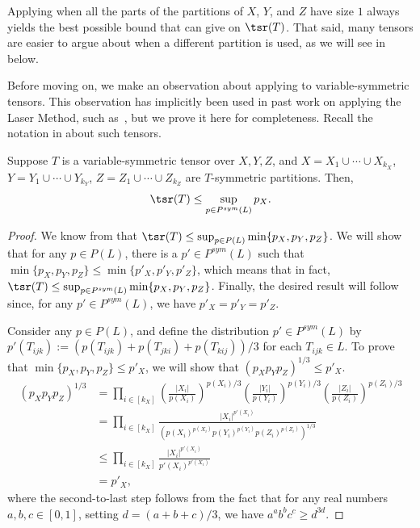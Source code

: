 \documentclass{toc}
\begin{document}
\begin{remark}
Applying  when all the parts of the partitions of $X$, $Y$, and $Z$ have size $1$ always yields the best possible bound that  can give on $\tsr(T)$. That said, many tensors are easier to argue about when a different partition is used, as we will see in  below.
\end{remark}


Before moving on, we make an observation about applying  to variable-symmetric tensors. This observation has implicitly been used in past work on applying the Laser Method, such as~\cite{coppersmith}, but we prove it here for completeness. Recall the notation in  about such tensors.

\begin{proposition} \label{symmprop}
Suppose $T$ is a variable-symmetric tensor over $X,Y,Z$, and $X = X_1 \cup \cdots \cup X_{k_X}$, $Y = Y_1 \cup \cdots \cup Y_{k_Y}$, $Z = Z_1 \cup \cdots \cup Z_{k_Z}$ are $T$-symmetric partitions. Then,
$$\tsr(T) \leq \sup_{p \in P^{sym}(L)} p_X.$$
\end{proposition}

\begin{proof}
We know from  that $\tsr(T) \leq \sup_{p \in P(L)} \min\{ p_X, p_Y, p_Z \}$. We will show that for any $p \in P(L)$, there is a $p' \in P^{sym}(L)$ such that $\min\{ p_X, p_Y, p_Z \} \leq \min\{ p'_X, p'_Y, p'_Z \}$, which means that in fact, $\tsr(T) \leq \sup_{p \in P^{sym}(L)} \min\{ p_X, p_Y, p_Z \}$. Finally, the desired result will follow since, for any $p' \in P^{sym}(L)$, we have $p'_X = p'_Y = p'_Z$. 

Consider any $p \in P(L)$, and define the distribution $p' \in P^{sym}(L)$ by $p'(T_{ijk}) := (p(T_{ijk}) + p(T_{jki}) + p(T_{kij}))/3$ for each $T_{ijk} \in L$. To prove that $\min\{ p_X, p_Y, p_Z \} \leq p'_X$, we will show that $(p_X p_Y p_Z)^{1/3}\leq p'_X$.
\begin{align*} 
(p_X p_Y p_Z)^{1/3} &=  \prod_{i \in [k_X]} \left( \frac{|X_i|}{p(X_i)}\right)^{p(X_i)/3} \left( \frac{|Y_i|}{p(Y_i)}\right)^{p(Y_i)/3} \left( \frac{|Z_i|}{p(Z_i)}\right)^{p(Z_i)/3}  \\
&= \prod_{i \in [k_X]} \frac{|X_i|^{p'(X_i)}}{(p(X_i)^{p(X_i)} p(Y_i)^{p(Y_i)} p(Z_i)^{p(Z_i)})^{1/3}} \\
&\leq \prod_{i \in [k_X]} \frac{|X_i|^{p'(X_i)}}{p'(X_i)^{p'(X_i)}} \\ 
&= p'_X,
\end{align*}
where the second-to-last step follows from the fact that for any real numbers $a,b,c \in [0,1]$, setting $d = (a+b+c)/3$, we have $a^a b^b c^c \geq d^{3d}$.
\end{proof}
\end{document}
